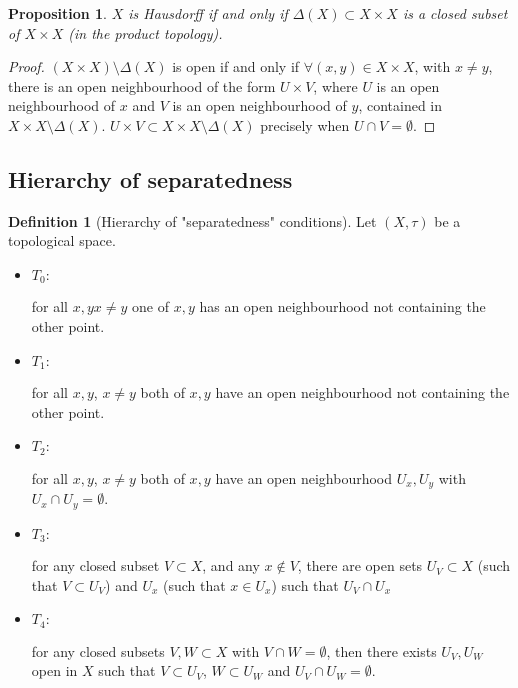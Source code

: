 \documentclass{article}
\theoremstyle{definition}
\newtheorem{defn}{Definition}[section]
\theoremstyle{plain}%
\newtheorem{prop}[thm]{Proposition}
\theoremstyle{remark}
\newcommand{\intersection}{\cap}
\begin{document}
\begin{prop}\label{Diagonal close in Haus}
    $X$ is Hausdorff if and only if $\Delta(X) \subset X \times X$ is a closed subset of $X \times X$ (in the product topology).
\end{prop}

\begin{proof}
    $(X \times X) \setminus \Delta(X)$ is open if and only if $\forall (x,y) \in X \times X$, with $x \ne y$, there is an open neighbourhood of the form $U \times V$, where $U$ is an open neighbourhood of $x$ and $V$ is an open neighbourhood of $y$, contained in $X \times X \setminus \Delta(X)$. $U \times V \subset X \times X \setminus \Delta(X)$ precisely when $U \intersection V = \emptyset$.
\end{proof}

\subsection{Hierarchy of separatedness}

\begin{defn}[Hierarchy of "separatedness" conditions]
    Let $(X, \tau)$ be a topological space.
    \begin{itemize}
        \item $T_0:$
        
        for all $x,y x \ne y$ one of $x,y$ has an open neighbourhood not containing the other point.
        \item $T_1:$
        
        for all $x,y$, $x \ne y$ both of $x,y$ have an open neighbourhood not containing the other point.
        \item $T_2:$
        
        for all $x,y$, $x \ne y$ both of $x,y$ have an open neighbourhood $U_x, U_y$ with $U_x \intersection U_y = \emptyset$.
        \item $T_3:$
        
        for any closed subset $V \subset X$, and any $x \not\in V$, there are open sets $U_V \subset X$ (such that $V \subset U_V$) and $U_x$ (such that $x \in U_x$) such that $U_V \intersection U_x$
        \item $T_4:$
        
        for any closed subsets $V, W \subset X$ with $V \intersection W = \emptyset$, then there exists $U_V, U_W$ open in $X$ such that $V \subset U_V$, $W \subset U_W$ and $U_V \intersection U_W = \emptyset$.
    \end{itemize}
\end{defn}
\end{document}
